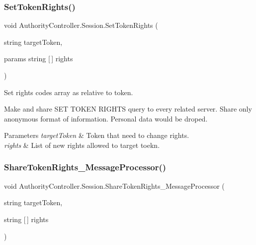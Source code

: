 \subsubsection{\texorpdfstring{Set\+Token\+Rights()}{SetTokenRights()}}
{\footnotesize\ttfamily void Authority\+Controller.\+Session.\+Set\+Token\+Rights (\begin{DoxyParamCaption}\item[{string}]{target\+Token,  }\item[{params string \mbox{[}$\,$\mbox{]}}]{rights }\end{DoxyParamCaption})}



Set rights\textquotesingle{} codes array as relative to token. 

Make and share S\+ET T\+O\+K\+EN R\+I\+G\+H\+TS query to every related server. Share only anonymous format of information. Personal data would be droped. 


\begin{DoxyParams}{Parameters}
{\em target\+Token} & Token that need to change rights.\\
\hline
{\em rights} & List of new rights allowed to target toekn.\\
\hline
\end{DoxyParams}
\mbox{\label{class_authority_controller_1_1_session_aea2ab13cf2e1cd192ef5e49935508b5b}} 
\subsubsection{\texorpdfstring{Share\+Token\+Rights\+\_\+\+Message\+Processor()}{ShareTokenRights\_MessageProcessor()}}
{\footnotesize\ttfamily void Authority\+Controller.\+Session.\+Share\+Token\+Rights\+\_\+\+Message\+Processor (\begin{DoxyParamCaption}\item[{string}]{target\+Token,  }\item[{string \mbox{[}$\,$\mbox{]}}]{rights }\end{DoxyParamCaption})\hspace{0.3cm}{\ttfamily [private]}}



